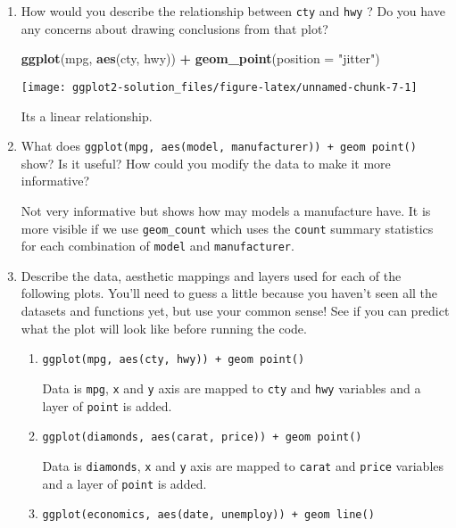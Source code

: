 \documentclass[]{book}
\newenvironment{Shaded}{\begin{snugshade}}{\end{snugshade}}
\newcommand{\KeywordTok}[1]{\textcolor[rgb]{0.13,0.29,0.53}{\textbf{#1}}}
\newcommand{\DataTypeTok}[1]{\textcolor[rgb]{0.13,0.29,0.53}{#1}}
\newcommand{\StringTok}[1]{\textcolor[rgb]{0.31,0.60,0.02}{#1}}
\newcommand{\OperatorTok}[1]{\textcolor[rgb]{0.81,0.36,0.00}{\textbf{#1}}}
\newcommand{\NormalTok}[1]{#1}
\begin{document}
\begin{enumerate}
\def\labelenumi{\arabic{enumi}.}
\item
  How would you describe the relationship between \texttt{cty} and
  \texttt{hwy} ? Do you have any concerns about drawing conclusions from
  that plot?

\begin{Shaded}
\begin{Highlighting}[]
\KeywordTok{ggplot}\NormalTok{(mpg, }\KeywordTok{aes}\NormalTok{(cty, hwy)) }\OperatorTok{+}\StringTok{ }\KeywordTok{geom_point}\NormalTok{(}\DataTypeTok{position =} \StringTok{"jitter"}\NormalTok{)}
\end{Highlighting}
\end{Shaded}

  \begin{center}\texttt{[image: ggplot2-solution\_files/figure-latex/unnamed-chunk-7-1]} \end{center}

  Its a linear relationship.
\item
  What does
  \texttt{ggplot(mpg,\ aes(model,\ manufacturer))\ +\ geom\ point()}
  show? Is it useful? How could you modify the data to make it more
  informative?

  Not very informative but shows how may models a manufacture have. It
  is more visible if we use \texttt{geom\_count} which uses the
  \texttt{count} summary statistics for each combination of
  \texttt{model} and \texttt{manufacturer}.
\item
  Describe the data, aesthetic mappings and layers used for each of the
  following plots. You'll need to guess a little because you haven't
  seen all the datasets and functions yet, but use your common sense!
  See if you can predict what the plot will look like before running the
  code.

  \begin{enumerate}
  \def\labelenumii{\alph{enumii}.}
  \item
    \texttt{ggplot(mpg,\ aes(cty,\ hwy))\ +\ geom\ point()}

    Data is \texttt{mpg}, \texttt{x} and \texttt{y} axis are mapped to
    \texttt{cty} and \texttt{hwy} variables and a layer of
    \texttt{point} is added.
  \item
    \texttt{ggplot(diamonds,\ aes(carat,\ price))\ +\ geom\ point()}

    Data is \texttt{diamonds}, \texttt{x} and \texttt{y} axis are mapped
    to \texttt{carat} and \texttt{price} variables and a layer of
    \texttt{point} is added.
  \item
    \texttt{ggplot(economics,\ aes(date,\ unemploy))\ +\ geom\ line()}


\end{enumerate}
\end{enumerate}
\end{document}
